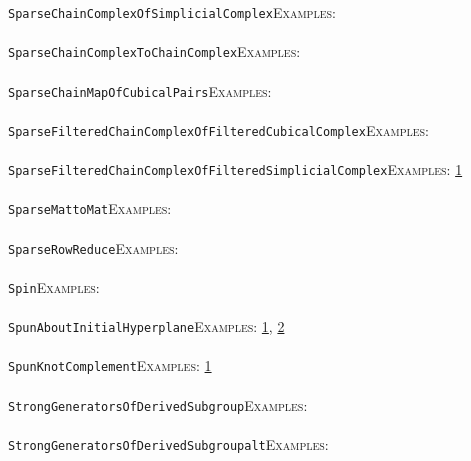 \documentclass[a4paper,11pt]{report}
\begin{document}
{{ \texttt{SparseChainComplexOfSimplicialComplex}{\nobreakspace}{\nobreakspace}{\nobreakspace}{\nobreakspace}\textsc{Examples:} \\
 \\
 \texttt{SparseChainComplexToChainComplex}{\nobreakspace}{\nobreakspace}{\nobreakspace}{\nobreakspace}\textsc{Examples:} \\
 \\
 \texttt{SparseChainMapOfCubicalPairs}{\nobreakspace}{\nobreakspace}{\nobreakspace}{\nobreakspace}\textsc{Examples:} \\
 \\
 \texttt{SparseFilteredChainComplexOfFilteredCubicalComplex}{\nobreakspace}{\nobreakspace}{\nobreakspace}{\nobreakspace}\textsc{Examples:} \\
 \\
 \texttt{SparseFilteredChainComplexOfFilteredSimplicialComplex}{\nobreakspace}{\nobreakspace}{\nobreakspace}{\nobreakspace}\textsc{Examples:} \href{../www/SideLinks/About/aboutPersistent.html} {1}{\nobreakspace} \\
 \\
 \texttt{SparseMattoMat}{\nobreakspace}{\nobreakspace}{\nobreakspace}{\nobreakspace}\textsc{Examples:} \\
 \\
 \texttt{SparseRowReduce}{\nobreakspace}{\nobreakspace}{\nobreakspace}{\nobreakspace}\textsc{Examples:} \\
 \\
 \texttt{Spin}{\nobreakspace}{\nobreakspace}{\nobreakspace}{\nobreakspace}\textsc{Examples:} \\
 \\
 \texttt{SpunAboutInitialHyperplane}{\nobreakspace}{\nobreakspace}{\nobreakspace}{\nobreakspace}\textsc{Examples:} \href{tutorial/chap3.html} {1}{\nobreakspace}, \href{../www/SideLinks/About/aboutCoverinSpaces.html} {2}{\nobreakspace} \\
 \\
 \texttt{SpunKnotComplement}{\nobreakspace}{\nobreakspace}{\nobreakspace}{\nobreakspace}\textsc{Examples:} \href{../www/SideLinks/About/aboutCoverinSpaces.html} {1}{\nobreakspace} \\
 \\
 \texttt{StrongGeneratorsOfDerivedSubgroup}{\nobreakspace}{\nobreakspace}{\nobreakspace}{\nobreakspace}\textsc{Examples:} \\
 \\
 \texttt{StrongGeneratorsOfDerivedSubgroup{\textunderscore}alt}{\nobreakspace}{\nobreakspace}{\nobreakspace}{\nobreakspace}\textsc{Examples:} \\
}}
\end{document}
